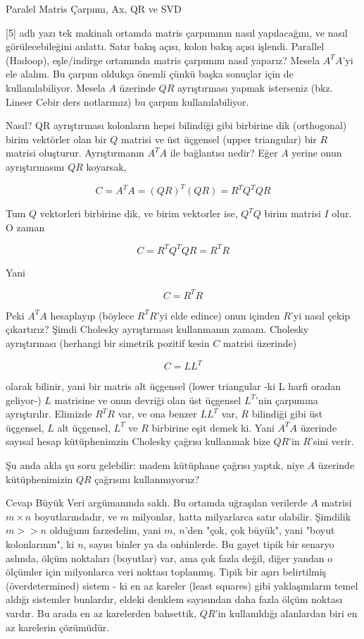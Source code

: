 \documentclass[12pt,fleqn]{article}\usepackage{../../common}
\begin{document}
Paralel Matris Çarpımı, Ax, QR ve SVD

[5] adlı yazı tek makinalı ortamda matris çarpımının nasıl yapılacağını, ve
nasıl görülecebileğini anlattı. Satır bakış açısı, kolon bakış açısı
işlendi. Parallel (Hadoop), eşle/indirge ortamında matris çarpımını nasıl
yaparız?  Mesela $A^TA$'yi ele alalım. Bu çarpım oldukça önemli çünkü başka
sonuçlar için de kullanılabiliyor. Mesela $A$ üzerinde $QR$ ayrıştırması
yapmak isterseniz (bkz. Lineer Cebir ders notlarımız) bu çarpım
kullanılabiliyor.

Nasıl? QR ayrıştırması kolonların hepsi bilindiği gibi birbirine dik
(orthogonal) birim vektörler olan bir $Q$ matrisi ve üst üçgensel (upper
triangular) bir $R$ matrisi oluşturur. Ayrıştırmanın $A^TA$ ile bağlantısı
nedir? Eğer $A$ yerine onun ayrıştırmasını $QR$ koyarsak,

$$
C = A^TA = (QR)^T (QR) = R^T Q^T QR
$$

Tum $Q$ vektorleri birbirine dik, ve birim vektorler ise, $Q^T Q$
birim matrisi $I$ olur. O zaman

$$
C = R^T Q^T QR = R^T R
$$

Yani

$$
C = R^TR
$$

Peki $A^TA$ hesaplayıp (böylece $R^TR$'yi elde edince) onun içinden $R$'yi nasıl
çekip çıkartırız? Şimdi Cholesky ayrıştırması kullanmanın zamanı. Cholesky
ayrıştırması (herhangi bir simetrik pozitif kesin $C$ matrisi üzerinde)

$$C = LL^T$$

olarak bilinir, yani bir matris alt üçgensel (lower triangular -ki L harfi
oradan geliyor-) $L$ matrisine ve onun devriği olan üst üçgensel $L^T$'nin
çarpımına ayrıştırılır. Elimizde $R^TR$ var, ve ona benzer $LL^T$ var, $R$
bilindiği gibi üst üçgensel, $L$ alt üçgensel, $L^T$ ve $R$ birbirine eşit demek
ki. Yani $A^TA$ üzerinde sayısal hesap kütüphenimzin Cholesky çağrısı kullanmak
bize $QR$'in $R$'sini verir.

Şu anda akla şu soru gelebilir: madem kütüphane çağrısı yaptık, niye $A$
üzerinde kütüphenimizin $QR$ çağrısını kullanmıyoruz?

Cevap Büyük Veri argümanında saklı. Bu ortamda uğraşılan verilerde $A$ matrisi
$m \times n$ boyutlarındadır, ve $m$ milyonlar, hatta milyarlarca satır
olabilir. Şimdilik $m >> n$ olduğunu farzedelim, yani $m$, $n$'den "çok, çok
büyük", yani "boyut kolonlarının", ki $n$, sayısı binler ya da onbinlerde. Bu
gayet tipik bir senaryo aslında, ölçüm noktaları (boyutlar) var, ama çok fazla
değil, diğer yandan o ölçümler için milyonlarca veri noktası toplanmış. Tipik
bir aşırı belirtilmiş (överdetermined) sistem - ki en az kareler (least squares)
gibi yaklaşımların temel aldığı sistemler bunlardır, eldeki denklem sayısından
daha fazla ölçüm noktası vardır. Bu arada en az karelerden bahsettik, $QR$'in
kullanıldığı alanlardan biri en az karelerin çözümüdür.
\end{document}
